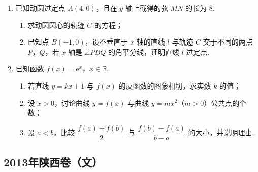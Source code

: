 \begin{description}
\begin{enumerate}[leftmargin=5pt]
\begin{enumerate}
\item 求观众甲选中 \(3\) 号歌手且观众乙未选中 \(3\) 号歌手的概率；
\item \(X\) 表示 \(3\) 号歌手得到观众甲、乙、丙的票数之和，求 \(X\) 的分布列和数学期望.
\end{enumerate}

        \item 已知动圆过定点 \(A(4,0)\)，且在 \(y\) 轴上截得的弦 \(MN\) 的长为 \(8\).

\begin{enumerate}
\item 求动圆圆心的轨迹 \(C\) 的方程；
\item 已知点 \(B(-1,0)\)，设不垂直于 \(x\) 轴的直线 \(l\) 与轨迹 \(C\) 交于不同的两点 \(P\)，\(Q\)，若 \(x\) 轴是 \(\angle PBQ\) 的角平分线，证明直线 \(l\) 过定点.
\end{enumerate}

        \item 已知函数 \(f(x)={\mathrm{e}}^x\)，\(x\in\mathbb{R}\).

\begin{enumerate}
\item 若直线 \(y=kx+1\) 与 \(f(x)\) 的反函数的图象相切，求实数 \(k\) 的值；
\item 设 \(x>0\)，讨论曲线 \(y=f(x)\) 与曲线 \(y=mx^2\)（\(m>0\)）公共点的个数；
\item 设 \(a<b\)，比较 \(\dfrac{f(a)+f(b)}{2}\) 与 \(\dfrac{f(b)-f(a)}{b-a}\) 的大小，并说明理由.
\end{enumerate}

    \end{enumerate}

\end{description}


\subsection{2013年陕西卷（文）}\label{gk:2013年陕西卷（文）}

